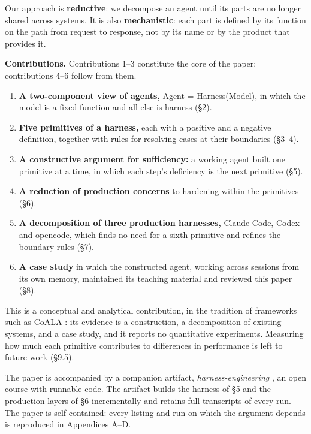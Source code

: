 Our approach is \textbf{reductive}: we decompose an agent until its parts are no longer shared across systems. It is also \textbf{mechanistic}: each part is defined by its function on the path from request to response, not by its name or by the product that provides it.

\textbf{Contributions.} Contributions 1--3 constitute the core of the paper; contributions 4--6 follow from them.

\begin{enumerate}
\def\labelenumi{\arabic{enumi}.}
\tightlist
\item
  \textbf{A two-component view of agents,} Agent = Harness(Model), in which the model is a fixed function and all else is harness (§2).
\item
  \textbf{Five primitives of a harness,} each with a positive and a negative definition, together with rules for resolving cases at their boundaries (§3--4).
\item
  \textbf{A constructive argument for sufficiency:} a working agent built one primitive at a time, in which each step's deficiency is the next primitive (§5).
\item
  \textbf{A reduction of production concerns} to hardening within the primitives (§6).
\item
  \textbf{A decomposition of three production harnesses,} Claude Code, Codex and opencode, which finds no need for a sixth primitive and refines the boundary rules (§7).
\item
  \textbf{A case study} in which the constructed agent, working across sessions from its own memory, maintained its teaching material and reviewed this paper (§8).
\end{enumerate}

This is a conceptual and analytical contribution, in the tradition of frameworks such as CoALA \cite{sumers2024cognitive}: its evidence is a construction, a decomposition of existing systems, and a case study, and it reports no quantitative experiments. Measuring how much each primitive contributes to differences in performance is left to future work (§9.5).

The paper is accompanied by a companion artifact, \emph{harness-engineering} \cite{course}, an open course with runnable code. The artifact builds the harness of §5 and the production layers of §6 incrementally and retains full transcripts of every run. The paper is self-contained: every listing and run on which the argument depends is reproduced in Appendices A--D.

